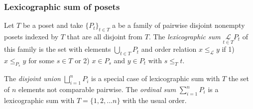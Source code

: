 \documentclass{article}[12pt]
\theoremstyle{exampstyle}
\theoremstyle{remark}
\newcommand{\lex}[1][]{\underset{#1}{\mathcal{L}}}
\begin{document}
\subsubsection*{Lexicographic sum of posets}

Let $T$ be a poset and take $\{P_t\}_{t \in T}$  a be a family of pairwise disjoint nonempty posets indexed by $T$ that are all disjoint from $T$.  The  \textit{lexicographic sum} $\displaystyle \lex[t \in T] P_t$ of this family is the set with elements $\displaystyle \bigcup_{t \in T} P_t$ and order relation $x \leq_{\lex} y$ if 1) $x \leq_{P_s} y$ for some $s \in T$ or 2) $x \in P_s$ and $y \in P_t$ with $s \leq_T t$.

The \textit{disjoint union} $\displaystyle \bigsqcup_{i=1}^n P_i$ is a special case of lexicographic sum with $T$ the set of $n$ elements not comparable pairwise. The \textit{ordinal sum} $\displaystyle \sum_{i=1}^n P_i$ is a lexicographic sum with $T = \{1,2, ... n\}$ with the usual order. 
\end{document}
